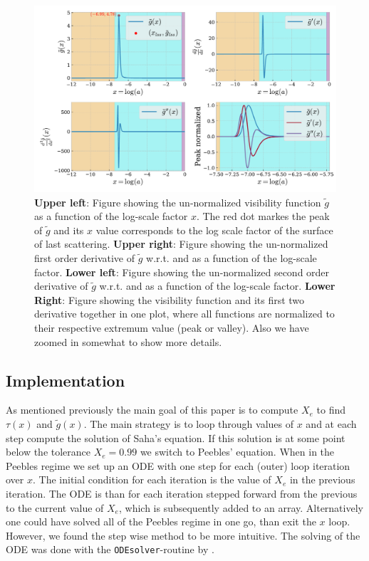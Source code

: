 \documentclass[twocolumn]{aastex62}
\begin{document}
\begin{figure}
    \includegraphics[scale = 0.65]{Figures/g_tilde.pdf}
    \caption{\textbf{Upper left}: Figure showing the un-normalized visibility function $\tilde{g}$ as a function of the log-scale factor $x$.
    The red dot markes the peak of $\tilde{g}$ 
    and its $x$ value corresponds to the log scale factor of the surface of last scattering. 
    \textbf{Upper right}: Figure showing the un-normalized first order derivative of $\tilde{g}$ w.r.t. and as a function of the log-scale factor. 
    \textbf{Lower left}: Figure showing the un-normalized second order derivative of $\tilde{g}$ w.r.t. and as a function of the log-scale factor.
    \textbf{Lower Right}: Figure showing the visibility function and its first two derivative together in one plot, where all functions are normalized to their respective extremum value (peak or valley). Also we have zoomed in somewhat to show more details.
    }
    \label{fig:g_tilde}
\end{figure}

\subsection{Implementation}\label{subsec:implementation}
As mentioned previously the main goal of this paper is to compute $X_e$ to find $\tau(x)$ and $\tilde{g}(x)$. The main strategy is to loop through values of $x$ and at each step compute the solution of Saha's equation. If this solution is at some point below the tolerance $X_e = 0.99$ we switch to Peebles' equation. When in the Peebles regime we set up an ODE with one step for each (outer) loop iteration over $x$. The initial condition for each iteration is the value of $X_e$ in the previous iteration. The ODE is than for each iteration stepped forward from the previous to the current value of $X_e$, which is subsequently added to an array. Alternatively one could have solved all of the Peebles regime in one go, than exit the $x$ loop. However, we found the step wise method to be more intuitive. The solving of the ODE was done with the \texttt{ODEsolver}-routine by \cite{winther:2020}.
\end{document}

